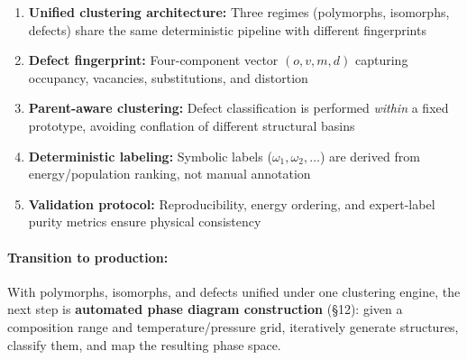 \documentclass[11pt]{article}
\begin{document}
\begin{enumerate}
  \item \textbf{Unified clustering architecture:} Three regimes (polymorphs,
        isomorphs, defects) share the same deterministic pipeline with different
        fingerprints
  \item \textbf{Defect fingerprint:} Four-component vector
        $(o, v, m, d)$ capturing occupancy, vacancies, substitutions, and
        distortion
  \item \textbf{Parent-aware clustering:} Defect classification is performed
        \emph{within} a fixed prototype, avoiding conflation of different
        structural basins
  \item \textbf{Deterministic labeling:} Symbolic labels ($\omega_1, \omega_2, \ldots$)
        are derived from energy/population ranking, not manual annotation
  \item \textbf{Validation protocol:} Reproducibility, energy ordering, and
        expert-label purity metrics ensure physical consistency
\end{enumerate}

\paragraph{Transition to production:}
With polymorphs, isomorphs, and defects unified under one clustering engine,
the next step is \textbf{automated phase diagram construction} (\S12):
given a composition range and temperature/pressure grid, iteratively generate
structures, classify them, and map the resulting phase space.
\end{document}
